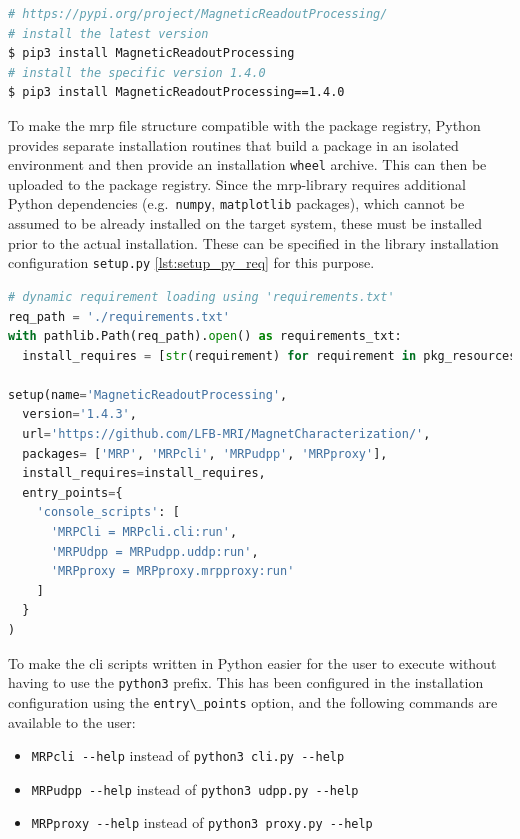 \begin{lstlisting}[language=bash, caption={Bash commands to install the MagneticReadoutProcessing library using pip}, label=lst:setup_lib_with_pip]
# https://pypi.org/project/MagneticReadoutProcessing/
# install the latest version
$ pip3 install MagneticReadoutProcessing
# install the specific version 1.4.0
$ pip3 install MagneticReadoutProcessing==1.4.0
\end{lstlisting}

To make the \gls{mrp} file structure compatible with the package
registry, Python provides separate installation routines that build a
package in an isolated environment and then provide an installation
\passthrough{\lstinline!wheel!} archive. This can then be uploaded to
the package registry. Since the \gls{mrp}-library requires additional
Python dependencies (e.g.~\passthrough{\lstinline!numpy!},
\passthrough{\lstinline!matplotlib!} packages), which cannot be assumed
to be already installed on the target system, these must be installed
prior to the actual installation. These can be specified in the library
installation configuration \passthrough{\lstinline!setup.py!}
\ref{lst:setup_py_req} for this purpose.

\begin{lstlisting}[language=Python, caption={setup.py with dynamic requirement parsing used given requirements.txt}, label=lst:setup_py_req]
# dynamic requirement loading using 'requirements.txt'
req_path = './requirements.txt'
with pathlib.Path(req_path).open() as requirements_txt:
  install_requires = [str(requirement) for requirement in pkg_resources.parse_requirements(requirements_txt)]

setup(name='MagneticReadoutProcessing',
  version='1.4.3',
  url='https://github.com/LFB-MRI/MagnetCharacterization/',
  packages= ['MRP', 'MRPcli', 'MRPudpp', 'MRPproxy'],
  install_requires=install_requires,
  entry_points={
    'console_scripts': [
      'MRPCli = MRPcli.cli:run',
      'MRPUdpp = MRPudpp.uddp:run',
      'MRPproxy = MRPproxy.mrpproxy:run'
    ]
  }
)
\end{lstlisting}

To make the \gls{cli} scripts written in Python easier for the user to
execute without having to use the \passthrough{\lstinline!python3!}
prefix. This has been configured in the installation configuration using
the \passthrough{\lstinline!entry\_points!} option, and the following
commands are available to the user:

\begin{itemize}
\tightlist
\item
  \passthrough{\lstinline!MRPcli --help!} instead of
  \passthrough{\lstinline!python3 cli.py --help!}
\item
  \passthrough{\lstinline!MRPudpp --help!} instead of
  \passthrough{\lstinline!python3 udpp.py --help!}
\item
  \passthrough{\lstinline!MRPproxy --help!} instead of
  \passthrough{\lstinline!python3 proxy.py --help!}
\end{itemize}

